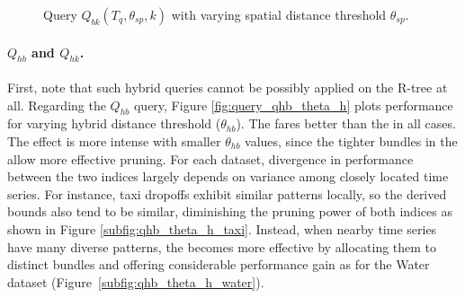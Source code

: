 \begin{figure}[!tb]
	\caption{Query $Q_{bk}(T_q, \theta_{sp}, k)$ with varying spatial distance threshold $\theta_{sp}$.}
	\label{fig:query_qbk_theta_sp}
\end{figure}

\paragraph{$Q_{hb}$ and $Q_{hk}$.} First, note that such hybrid queries cannot be possibly applied on the R-tree at all. Regarding the $Q_{hb}$ query, Figure \ref{fig:query_qhb_theta_h} plots performance for varying hybrid distance threshold ($\theta_{hb}$). The \btsr fares better than the \tsr in all cases. The effect is more intense with smaller $\theta_{hb}$ values, since the tighter bundles in the \btsr allow more effective pruning. For each dataset, divergence in performance between the two indices largely depends on variance among closely located time series. For instance, taxi dropoffs exhibit similar patterns locally, so the derived bounds also tend to be similar, diminishing the pruning power of both indices as shown in Figure \ref{subfig:qhb_theta_h_taxi}. Instead, when nearby time series have many diverse patterns, the \btsr becomes more effective by allocating them to distinct bundles and offering considerable performance gain as for the Water dataset (Figure~\ref{subfig:qhb_theta_h_water}).

